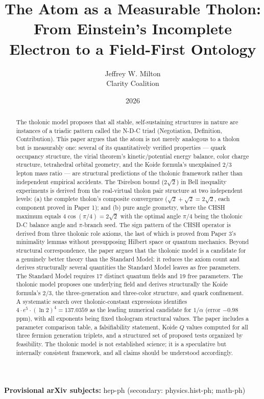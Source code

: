 \documentclass[12pt]{article}
\title{The Atom as a Measurable Tholon:\\
\large From Einstein's Incomplete Electron to a Field-First Ontology}
\author{Jeffrey W. Milton\\[4pt]{\small Clarity Coalition}}
\date{2026}
\begin{document}
\maketitle

\noindent\textbf{Provisional arXiv subjects:} hep-ph (secondary: physics.hist-ph; math-ph)

\begin{abstract}
The tholonic model proposes that all stable, self-sustaining structures
in nature are instances of a triadic pattern called the N-D-C triad
(Negotiation, Definition, Contribution). This paper argues that the atom
is not merely analogous to a tholon but is measurably one: several of
its quantitatively verified properties --- quark occupancy structure,
the virial theorem's kinetic/potential energy balance, color charge
structure, tetrahedral orbital geometry, and the Koide formula's
unexplained \(2/3\) lepton mass ratio --- are structural predictions of
the tholonic framework rather than independent empirical accidents. The
Tsirelson bound (\(2\sqrt{2}\)) in Bell inequality experiments is
derived from the real-virtual tholon pair structure at two independent
levels: (a) the complete tholon's composite convergence
(\(\sqrt{2} + \sqrt{2} = 2\sqrt{2}\), each component proved in Paper 1);
and (b) pure angle geometry, where the CHSH maximum equals
\(4\cos(\pi/4) = 2\sqrt{2}\) with the optimal angle \(\pi/4\) being the
tholonic D-C balance angle and \(\pi\)-branch seed. The sign pattern of
the CHSH operator is derived from three tholonic role axioms, the last
of which is proved from Paper 3's minimality lemmas without presupposing
Hilbert space or quantum mechanics. Beyond structural correspondence,
the paper argues that the tholonic model is a candidate for a genuinely
better theory than the Standard Model: it reduces the axiom count and
derives structurally several quantities the Standard Model leaves as
free parameters. The Standard Model requires 17 distinct quantum fields
and 19 free parameters. The tholonic model proposes one underlying field
and derives structurally the Koide formula's \(2/3\), the
three-generation and three-color structure, and quark confinement. A
systematic search over tholonic-constant expressions identifies
\(4 \cdot e^5 \cdot (\ln 2)^4 = 137.0359\) as the leading numerical
candidate for \(1/\alpha\) (error \(-0.98\) ppm), with all exponents
being fixed thologram structural values. The paper includes a parameter
comparison table, a falsifiability statement, Koide \(Q\) values
computed for all three fermion generation triplets, and a structured set
of proposed tests organized by feasibility. The tholonic model is not
established science; it is a speculative but internally consistent
framework, and all claims should be understood accordingly.
\end{abstract}
\end{document}
